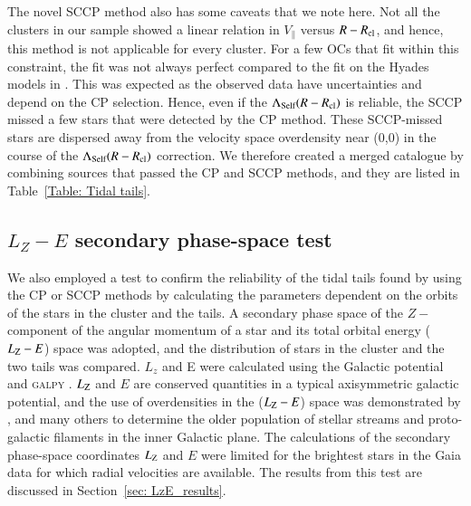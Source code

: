 \documentclass{aa}
\begin{document}
The novel SCCP method also has some caveats that we note here. Not all the clusters in our sample showed a linear relation in $V_{\parallel}$ versus $R- R\textsubscript{cl}$, and hence, this method is not applicable for every cluster. For a few OCs that fit within this constraint, the fit was not always perfect compared to the fit on the Hyades models in \citet{2021A&A...647A.137Jerabkova}. This was expected as the observed data have uncertainties and depend on the CP selection. Hence, even if the $\Lambda\textsubscript{Self}(R - R\textsubscript{cl})$ is reliable, the SCCP missed a few stars that were detected by the CP method. These SCCP-missed stars are dispersed away from the velocity space overdensity near (0,0) in the course of the $\Lambda\textsubscript{Self}(R - R\textsubscript{cl})$ correction. We therefore created a merged catalogue by combining sources that passed the CP and SCCP methods, and they are listed in Table~\ref{Table: Tidal tails}.

\subsection{$L_{Z}-E$ secondary phase-space test}\label{sec: LzE_test}

We also employed a test to confirm the reliability of the tidal tails found by using the CP or SCCP methods by calculating the parameters dependent on the orbits of the stars in the cluster and the tails. A secondary phase space of the $Z-$component of the angular momentum of a star and its total orbital energy ($L\textsubscript{Z}-E$) space was adopted, and the distribution of stars in the cluster and the two tails was compared. $L_z$ and E were calculated using the \citet{McMillan2017MNRAS.465...76M} Galactic potential and \textsc{galpy} \citep{Bovy2015ApJS..216...29B}.  $L\textsubscript{Z}$ and $E$ are conserved quantities in a typical axisymmetric galactic potential, and the use of overdensities in the ($L\textsubscript{Z}-E$) space was demonstrated by \citet{Bonaca_2021}, \citet{2024ApJ...964..104Malhan} and many others to determine the older population of stellar streams and proto-galactic filaments in the inner Galactic plane. The calculations of the secondary phase-space coordinates $L\textsubscript{Z}$ and $E$ were limited for the brightest stars in the Gaia data for which radial velocities are available. The results from this test are discussed in Section~\ref{sec: LzE_results}.
\end{document}
